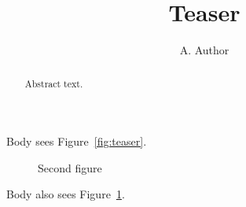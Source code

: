 \documentclass{article}
\title{Teaser}\author{A. Author}\date{}
\begin{document}
\maketitle
\begin{abstract}Abstract text.\end{abstract}
Body sees Figure~\ref{fig:teaser}.
\begin{figure}\caption{Second figure}\label{fig:second}\end{figure}
Body also sees Figure~\ref{fig:second}.
\end{document}
